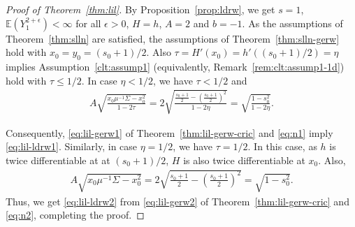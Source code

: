 \documentclass[12pt]{amsart}
\theoremstyle{plain}
\theoremstyle{remark}
\numberwithin{equation}{section}
\begin{document}
\begin{proof}[Proof of Theorem~\ref{thm:lil}] 
By Proposition~\ref{prop:ldrw}, we get $s=1$, $\mathbb{E}\left({Y}_1^{2+\epsilon}\right) < \infty$ for all $\epsilon > 0$, ${H} = h$, $A = 2$ and $b = -1$. As the assumptions of Theorem~\ref{thm:slln} are satisfied, %
the assumptions of Theorem~\ref{thm:slln-gerw} hold with $x_0 = y_0 = (s_0+1)/2$. Also $\tau = H'(x_0) = h'((s_0+1)/2) = \eta$ implies Assumption~\ref{clt:assump1} (equivalently, Remark~\ref{rem:clt:assump1-1d}) hold with $\tau \leq 1/2$. In case $\eta < 1/2$, we have $\tau < 1/2$ and 
\begin{align}\label{eq:n1}
   A\sqrt{\frac{x_0\mu^{-1}{\Sigma}-x^2_0}{1-2\tau}} = 2\sqrt{\frac{\frac{s_0+1}{2} -  \left(\frac{s_0+1}{2}\right)^2}{1-2\eta}} = \sqrt{\frac{1-s^2_0}{1-2\eta}}.
\end{align}

Consequently, \eqref{eq:lil-gerw1} of Theorem~\ref{thm:lil-gerw-cric} and \eqref{eq:n1} imply \eqref{eq:lil-ldrw1}. Similarly, in case $\eta = 1/2$, we have $\tau = 1/2$. In this case, as $h$ is twice differentiable at at $(s_0+1)/2$, ${H}$ is also twice differentiable at ${x}_0$. Also,
\begin{align}\label{eq:n2}
   A\sqrt{{x_0\mu^{-1}{\Sigma}-x^2_0}} = 2\sqrt{{\frac{s_0+1}{2} -  \left(\frac{s_0+1}{2}\right)^2}} = \sqrt{{1-s^2_0}}.
\end{align}
Thus, we get \eqref{eq:lil-ldrw2} from \eqref{eq:lil-gerw2} of Theorem~\ref{thm:lil-gerw-cric} and \eqref{eq:n2}, completing the proof.
\end{proof}
\end{document}
